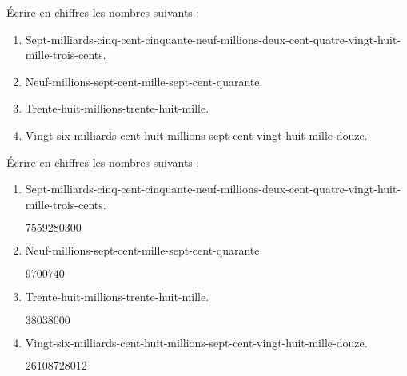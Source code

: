\begin{exercice}
    Écrire en chiffres les nombres suivants :
    \begin{enumerate}
       \item Sept-milliards-cinq-cent-cinquante-neuf-millions-deux-cent-quatre-vingt-huit-mille-trois-cents.
       \item Neuf-millions-sept-cent-mille-sept-cent-quarante. 
       \item Trente-huit-millions-trente-huit-mille.
       \item Vingt-six-milliards-cent-huit-millions-sept-cent-vingt-huit-mille-douze.
    \end{enumerate}
\end{exercice}


\begin{corrige}
    Écrire en chiffres les nombres suivants :
    
    \begin{enumerate}
       \item Sept-milliards-cinq-cent-cinquante-neuf-millions-deux-cent-quatre-vingt-huit-mille-trois-cents.
       
       {\red $\num{7559280300}$}
       \item Neuf-millions-sept-cent-mille-sept-cent-quarante. 
       
       {\red $\num{9700740}$}
       \item Trente-huit-millions-trente-huit-mille.
       
       {\red $\num{38038000}$}
       \item Vingt-six-milliards-cent-huit-millions-sept-cent-vingt-huit-mille-douze.
       
       {\red $\num{26108728012}$}
    \end{enumerate}
\end{corrige}